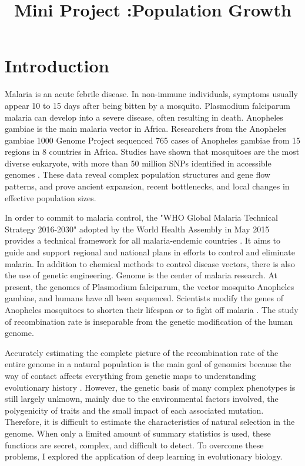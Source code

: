 \documentclass[11pt,a4 paper,title page]{article}
\title{\textbf{Mini Project :Population Growth}}
\begin{document}
\maketitle
\linenumbers 
 \section{Introduction}
  Malaria is an acute febrile disease. In non-immune individuals, symptoms usually appear 10 to 15 days after being bitten by a mosquito. Plasmodium falciparum malaria can develop into a severe disease, often resulting in death. Anopheles gambiae is the main malaria vector in Africa. Researchers from the Anopheles gambiae 1000 Genome Project sequenced 765 cases of Anopheles gambiae from 15 regions in 8 countries in Africa. Studies have shown that mosquitoes are the most diverse eukaryote, with more than 50 million SNPs identified in accessible genomes \cite{anopheles2017genetic}. These data reveal complex population structures and gene flow patterns, and prove ancient expansion, recent bottlenecks, and local changes in effective population sizes. 
  \hfill\break
  
    In order to commit to malaria control, the "WHO Global Malaria Technical Strategy 2016-2030" adopted by the World Health Assembly in May 2015 provides a technical framework for all malaria-endemic countries \cite{malaria2005world}. It aims to guide and support regional and national plans in efforts to control and eliminate malaria. In addition to chemical methods to control disease vectors, there is also the use of genetic engineering. Genome is the center of malaria research. At present, the genomes of Plasmodium falciparum, the vector mosquito Anopheles gambiae, and humans have all been sequenced. Scientists modify the genes of Anopheles mosquitoes to shorten their lifespan or to fight off malaria \cite{ito2002transgenic}. The study of recombination rate is inseparable from the genetic modification of the human genome.
  \hfill\break
  
  Accurately estimating the complete picture of the recombination rate of the entire genome in a natural population is the main goal of genomics because the way of contact affects everything from genetic maps to understanding evolutionary history \cite{ torada2019imagene}. However, the genetic basis of many complex phenotypes is still largely unknown, mainly due to the environmental factors involved, the polygenicity of traits and the small impact of each associated mutation. Therefore, it is difficult to estimate the characteristics of natural selection in the genome. When only a limited amount of summary statistics is used, these functions are secret, complex, and difficult to detect. To overcome these problems, I explored the application of deep learning in evolutionary biology.
  \hfill\break
  
\end{document}
